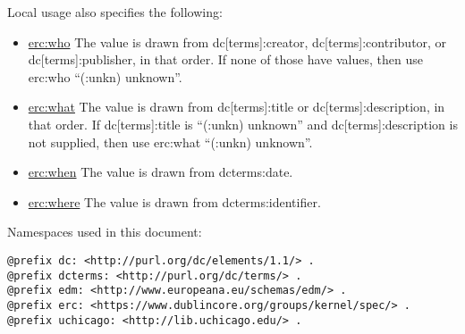 \documentclass[11pt]{article}
\begin{document}
Local usage also specifies the following:

\begin{itemize}
\item \underline{erc:who} The value is drawn from dc[terms]:creator, dc[terms]:contributor, or dc[terms]:publisher, in that order. If none of those have values, then use erc:who ``(:unkn) unknown''.
\item \underline{erc:what} The value is drawn from dc[terms]:title or dc[terms]:description, in that order. If dc[terms]:title is ``(:unkn) unknown'' and dc[terms]:description is not supplied, then use erc:what ``(:unkn) unknown''.
\item \underline{erc:when} The value is drawn from dcterms:date.
\item \underline{erc:where} The value is drawn from dcterms:identifier.
\end{itemize}

Namespaces used in this document:

\begin{verbatim}
@prefix dc: <http://purl.org/dc/elements/1.1/> .
@prefix dcterms: <http://purl.org/dc/terms/> .
@prefix edm: <http://www.europeana.eu/schemas/edm/> .
@prefix erc: <https://www.dublincore.org/groups/kernel/spec/> .
@prefix uchicago: <http://lib.uchicago.edu/> .
\end{verbatim}
\end{document}
